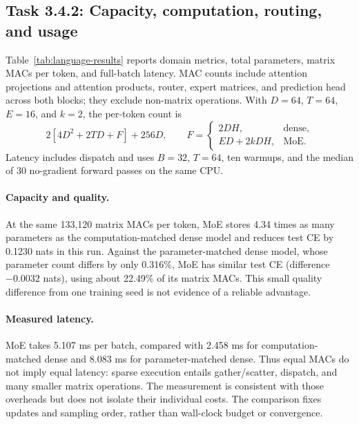 \subsection{Task 3.4.2: Capacity, computation, routing, and usage}
Table~\ref{tab:language-results} reports domain metrics, total parameters, matrix MACs per token, and full-batch latency. MAC counts include attention projections and attention products, router, expert matrices, and prediction head across both blocks; they exclude non-matrix operations. With $D=64$, $T=64$, $E=16$, and $k=2$, the per-token count is
\begin{equation}
2\left[4D^2+2TD+F\right]+256D,\qquad
F=\begin{cases}2DH, & \text{dense},\\ ED+2kDH, & \text{MoE}.\end{cases}
\end{equation}
Latency includes dispatch and uses $B=32$, $T=64$, ten warmups, and the median of 30 no-gradient forward passes on the same CPU.


\paragraph{Capacity and quality.}
At the same 133,120 matrix MACs per token, MoE stores 4.34 times as many parameters as the computation-matched dense model and reduces test CE by 0.1230 nats in this run. Against the parameter-matched dense model, whose parameter count differs by only 0.316\%, MoE has similar test CE (difference $-0.0032$ nats), using about 22.49\% of its matrix MACs. This small quality difference from one training seed is not evidence of a reliable advantage.

\paragraph{Measured latency.}
MoE takes 5.107 ms per batch, compared with 2.458 ms for computation-matched dense and 8.083 ms for parameter-matched dense. Thus equal MACs do not imply equal latency: sparse execution entails gather/scatter, dispatch, and many smaller matrix operations. The measurement is consistent with those overheads but does not isolate their individual costs. The comparison fixes updates and sampling order, rather than wall-clock budget or convergence.

